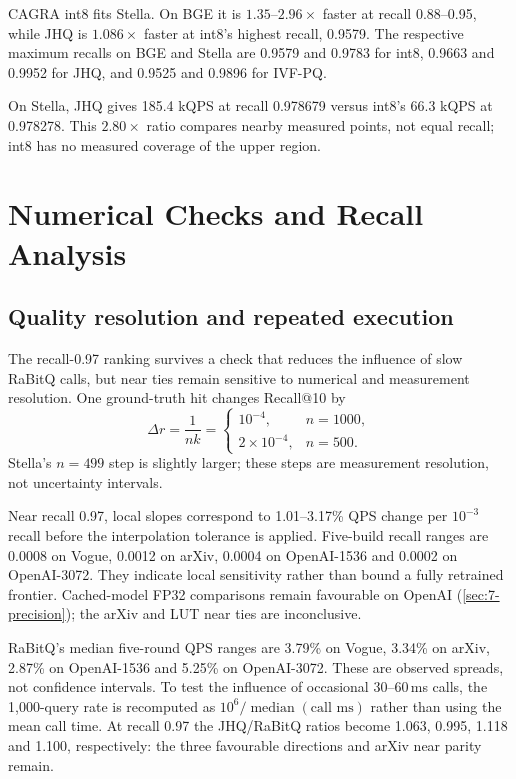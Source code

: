 CAGRA int8 fits Stella. On BGE it is $1.35$--$2.96\times$ faster at
recall 0.88--0.95, while JHQ is $1.086\times$ faster at int8's highest
recall, 0.9579. The respective maximum recalls on BGE and Stella are
0.9579 and 0.9783 for int8, 0.9663 and 0.9952 for JHQ, and 0.9525 and
0.9896 for IVF-PQ.

On Stella, JHQ gives 185.4 kQPS at recall 0.978679 versus int8's
66.3 kQPS at 0.978278. This $2.80\times$ ratio compares nearby measured
points, not equal recall; int8 has no measured coverage of the upper
region.

\section{Numerical Checks and Recall Analysis}
\label{sec:7-8}

\subsection{Quality resolution and repeated execution}

The recall-0.97 ranking survives a check that reduces the influence of
slow RaBitQ calls, but near ties remain sensitive to numerical and
measurement resolution. One ground-truth hit changes Recall@10 by
\[
 \Delta r=\frac1{nk}=
 \begin{cases}10^{-4},&n=1000,\\2\times10^{-4},&n=500.\end{cases}
\]
Stella's $n=499$ step is slightly larger; these steps are measurement
resolution, not uncertainty intervals.

Near recall 0.97, local slopes correspond to 1.01--3.17\% QPS change
per $10^{-3}$ recall before the interpolation tolerance is applied.
Five-build recall ranges are 0.0008 on Vogue, 0.0012 on arXiv,
0.0004 on OpenAI-1536 and 0.0002 on OpenAI-3072. They indicate local
sensitivity rather than bound a fully retrained frontier.
Cached-model FP32 comparisons remain favourable on OpenAI
(\cref{sec:7-precision}); the arXiv and LUT near ties are inconclusive.

RaBitQ's median five-round QPS ranges are 3.79\% on Vogue, 3.34\% on
arXiv, 2.87\% on OpenAI-1536 and 5.25\% on OpenAI-3072. These are
observed spreads, not confidence intervals. To test the influence of
occasional 30--60\,ms calls, the 1,000-query rate is recomputed as
$10^6/\operatorname{median}(\text{call ms})$ rather than using the mean
call time. At recall 0.97 the JHQ/RaBitQ ratios become 1.063, 0.995,
1.118 and 1.100, respectively: the three favourable directions and
arXiv near parity remain.

